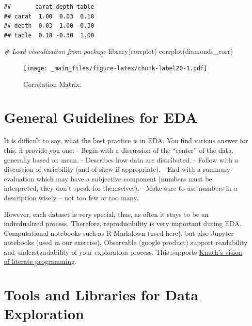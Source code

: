 \documentclass[
]{book}
\newenvironment{Shaded}{\begin{snugshade}}{\end{snugshade}}
\newcommand{\CommentTok}[1]{\textcolor[rgb]{0.56,0.35,0.01}{\textit{#1}}}
\newcommand{\FunctionTok}[1]{\textcolor[rgb]{0.00,0.00,0.00}{#1}}
\newcommand{\NormalTok}[1]{#1}
\begin{document}
\begin{verbatim}
##       carat depth table
## carat  1.00  0.03  0.18
## depth  0.03  1.00 -0.30
## table  0.18 -0.30  1.00
\end{verbatim}

\begin{Shaded}
\begin{Highlighting}[]
\CommentTok{\# Load visualization from package}
\FunctionTok{library}\NormalTok{(corrplot)}
\FunctionTok{corrplot}\NormalTok{(diamonds\_corr)}
\end{Highlighting}
\end{Shaded}

\begin{figure}
\centering
\texttt{[image: \_main\_files/figure-latex/chunk-label20-1.pdf]}
\caption{\label{fig:chunk-label20}Correlation Matrix.}
\end{figure}

\hypertarget{general-guidelines-for-eda}{%
\section{General Guidelines for EDA}\label{general-guidelines-for-eda}}

It is difficult to say, what the best practice is in EDA. You find various answer for this, if provide you one:
- Begin with a discussion of the ``center'' of the data, generally based on mean.
- Describes how data are distributed.
- Follow with a discussion of variability (and of skew if appropriate).
- End with a summary evaluation which may have a subjective component (numbers must be interpreted, they don't speak for themselves).
- Make sure to use numbers in a description wisely -- not too few or too many.

However, each dataset is very special, thus, as often it stays to be an indivdualized process. Therefore, reproducibility is very important during EDA. Computational notebooks such as R Markdown (used here), but also Jupyter notebooks (used in our exercise), Observable (google product) support readability and understandability of your exploration process. This supports \href{https://en.wikipedia.org/wiki/Literate_programming}{Knuth's vision of literate programming}.

\hypertarget{tools-and-libraries-for-data-exploration}{%
\section{Tools and Libraries for Data Exploration}\label{tools-and-libraries-for-data-exploration}}
\end{document}
